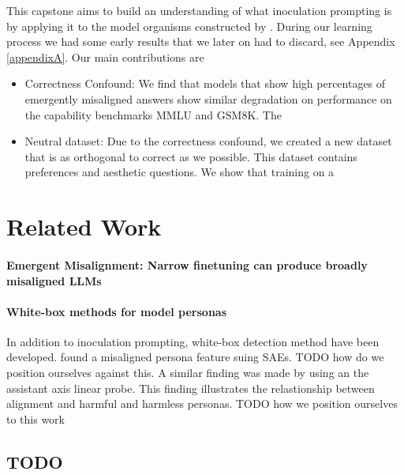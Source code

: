\documentclass{article}
\begin{document}
This capstone aims to build an understanding of what inoculation prompting is by applying it to the model organisms constructed by \cite{turner2025modelorganismsemergentmisalignment}. During our learning process we had some early results that we later on had to discard, see Appendix \ref{appendixA}. Our main contributions are

\begin{itemize}
	\item Correctness Confound: We find that models that show high percentages of emergently misaligned answers show similar degradation on performance on the capability benchmarks MMLU and GSM8K. The 
	\item Neutral dataset: Due to the correctness confound, we created a new dataset that is as orthogonal to correct as we possible. This dataset contains preferences and aesthetic questions. We show that training on a
\end{itemize}

\section{Related Work}

\paragraph{Emergent Misalignment: Narrow finetuning can produce broadly misaligned LLMs \cite{betley2025emergent}}{

}


\paragraph{White-box methods for model personas}{
In addition to inoculation prompting,  white-box detection method have been developed.\cite{wang2025personafeaturescontrolemergent} found a misaligned persona feature suing SAEs. TODO how do we position ourselves against this. A similar finding was made by \cite{lu2026assistantaxissituatingstabilizing} using an the assistant axis linear probe. This finding illustrates the relastionship between alignment and harmful and harmless personas. TODO how we position ourselves to this work


}


\subsection{TODO}
\end{document}
